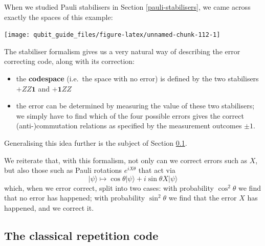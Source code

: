 \documentclass[fleqn,a4paper]{article}
\providecommand{\tightlist}{\setlength{\itemsep}{0pt}\setlength{\parskip}{0pt}}
\renewcommand{\footnote}[1]{\sidenotetext[{\color{white}0}\!\!]{\footnotesize #1}}
\newenvironment{idea}{\everypar{\setlength{\parindent}{1.5em}}}{}
\theoremstyle{definition}
\theoremstyle{definition}
\theoremstyle{definition}
\theoremstyle{definition}
\theoremstyle{remark}
\begin{document}
When we studied Pauli stabilisers in Section \ref{pauli-stabilisers}, we came across exactly the spaces of this example:

\begin{center}\texttt{[image: qubit\_guide\_files/figure-latex/unnamed-chunk-112-1]} \end{center}

\begin{idea}

The stabiliser formalism gives us a very natural way of describing the error correcting code, along with its correction:

\begin{itemize}
\tightlist
\item
  the \textbf{codespace} (i.e.~the space with no error) is defined by the two stabilisers \(+ZZ\mathbf{1}\) and \(+\mathbf{1}ZZ\)
\item
  the error can be determined by measuring the value of these two stabilisers; we simply have to find which of the four possible errors gives the correct (anti-)commutation relations as specified by the measurement outcomes \(\pm1\).
\end{itemize}

\end{idea}

Generalising this idea further is the subject of Section \ref{the-classical-repetition-code}.

We reiterate that, with this formalism, not only can we correct errors such as \(X\), but also those such as Pauli rotations \(e^{iX\theta}\) that act via
\[
  |\psi\rangle
  \longmapsto \cos\theta|\psi\rangle + i\sin\theta X|\psi\rangle
\]
which, when we error correct, split into two cases: with probability \(\cos^2\theta\) we find that no error has happened; with probability \(\sin^2\theta\) we find that the error \(X\) has happened, and we correct it.\footnote{See Exercise \ref{three-qubits-correcting-rotations}}

\hypertarget{the-classical-repetition-code}{%
\subsection{The classical repetition code}\label{the-classical-repetition-code}}
\end{document}
